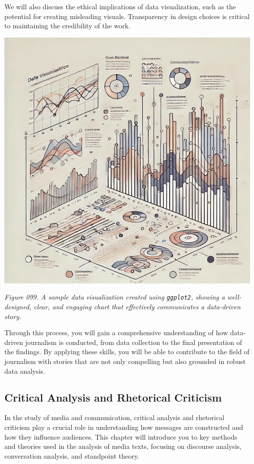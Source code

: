 \documentclass[
]{book}
\begin{document}
We will also discuss the ethical implications of data visualization, such as the potential for creating misleading visuals. Transparency in design choices is critical to maintaining the credibility of the work.

\includegraphics[width=1\linewidth,height=\textheight,keepaspectratio]{images/fig099.jpg}

\emph{Figure 099. A sample data visualization created using \texttt{ggplot2}, showing a well-designed, clear, and engaging chart that effectively communicates a data-driven story.}

Through this process, you will gain a comprehensive understanding of how data-driven journalism is conducted, from data collection to the final presentation of the findings. By applying these skills, you will be able to contribute to the field of journalism with stories that are not only compelling but also grounded in robust data analysis.

\subsection{Critical Analysis and Rhetorical Criticism}\label{critical-analysis-and-rhetorical-criticism}

In the study of media and communication, critical analysis and rhetorical criticism play a crucial role in understanding how messages are constructed and how they influence audiences. This chapter will introduce you to key methods and theories used in the analysis of media texts, focusing on discourse analysis, conversation analysis, and standpoint theory.
\end{document}
